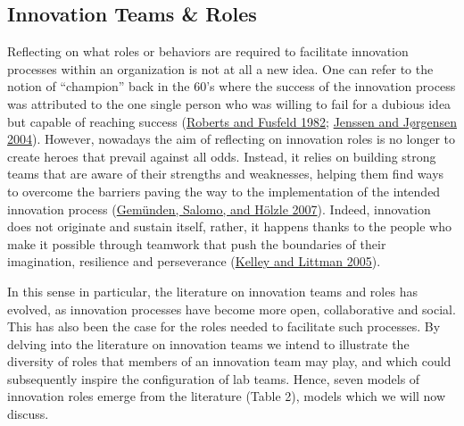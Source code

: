 \documentclass[AMA,STIX1COL,APA,STIX2COL]{WileyNJD-v2}
\begin{document}
\hypertarget{innovation-teams-roles}{%
\subsection{Innovation Teams \& Roles}\label{innovation-teams-roles}}

Reflecting on what roles or behaviors are required to facilitate
innovation processes within an organization is not at all a new idea.
One can refer to the notion of ``champion'' back in the 60's where the
success of the innovation process was attributed to the one single
person who was willing to fail for a dubious idea but capable of
reaching success (\protect\hyperlink{ref-Roberts1982}{Roberts and
Fusfeld 1982}; \protect\hyperlink{ref-Jenssen2004}{Jenssen and Jørgensen
2004}). However, nowadays the aim of reflecting on innovation roles is
no longer to create heroes that prevail against all odds. Instead, it
relies on building strong teams that are aware of their strengths and
weaknesses, helping them find ways to overcome the barriers paving the
way to the implementation of the intended innovation process
(\protect\hyperlink{ref-Gemunden2007}{Gemünden, Salomo, and Hölzle
2007}). Indeed, innovation does not originate and sustain itself,
rather, it happens thanks to the people who make it possible through
teamwork that push the boundaries of their imagination, resilience and
perseverance (\protect\hyperlink{ref-Kelley2005}{Kelley and Littman
2005}).

In this sense in particular, the literature on innovation teams and
roles has evolved, as innovation processes have become more open,
collaborative and social. This has also been the case for the roles
needed to facilitate such processes. By delving into the literature on
innovation teams we intend to illustrate the diversity of roles that
members of an innovation team may play, and which could subsequently
inspire the configuration of lab teams. Hence, seven models of
innovation roles emerge from the literature (Table 2), models which we
will now discuss.
\end{document}
